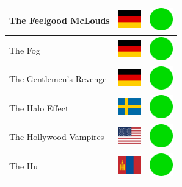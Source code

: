 \documentclass[12pt, a4paper, twoside]{report}
\begin{document}
\begin{center}
\begin{longtable}{|p{5cm}|p{2cm}|p{2cm}|}
 The Feelgood McLouds                                       & \includegraphics[width=1cm]{../4x3/de} &   \includegraphics[width=1cm]{../likes/y} \\ \hline
 The Fog                                                    & \includegraphics[width=1cm]{../4x3/de} &   \includegraphics[width=1cm]{../likes/y} \\ \hline
 The Gentlemen's Revenge                                    & \includegraphics[width=1cm]{../4x3/de} &   \includegraphics[width=1cm]{../likes/y} \\ \hline
 The Halo Effect                                            & \includegraphics[width=1cm]{../4x3/se} &   \includegraphics[width=1cm]{../likes/y} \\ \hline
 The Hollywood Vampires                                     & \includegraphics[width=1cm]{../4x3/us} &   \includegraphics[width=1cm]{../likes/y} \\ \hline
 The Hu                                                     & \includegraphics[width=1cm]{../4x3/mn} &   \includegraphics[width=1cm]{../likes/y} \\ \hline

\end{longtable}
\end{center}
\end{document}

